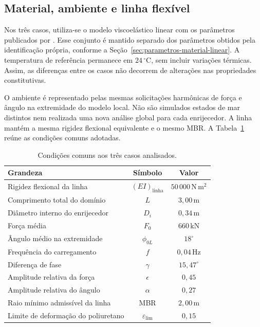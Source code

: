 \documentclass[arial,centeredequations,english,brazilian,oneside,section=TITLE]{ifes8}
\begin{document}
\subsection{Material, ambiente e linha flexível}
\label{sec:material-ambiente-linha-flexivel}

Nos três casos, utiliza-se o modelo viscoelástico linear com os parâmetros
publicados por . Esse conjunto é mantido separado
dos parâmetros obtidos pela identificação própria, conforme a
Seção~\ref{sec:parametros-material-linear}. A temperatura de referência
permanece em $24\,^{\circ}\mathrm{C}$, sem incluir variações térmicas.
Assim, as diferenças entre os casos não decorrem de alterações nas
propriedades constitutivas.

O ambiente é representado pelas mesmas solicitações harmônicas de força e
ângulo na extremidade do modelo local. Não são simulados estados de mar
distintos nem realizada uma nova análise global para cada enrijecedor.
A linha mantém a mesma rigidez flexional equivalente e o mesmo MBR.
A Tabela~\ref{tab:condicoes-comuns-estudo} reúne as condições comuns adotadas.

\begin{table}[!htbp]
  \centering
  \caption{Condições comuns aos três casos analisados.}
  \label{tab:condicoes-comuns-estudo}
  \begin{tabular}{l c c}
    \hline
    Grandeza & Símbolo & Valor\\
    \hline
    Rigidez flexional da linha & $(EI)_{\mathrm{linha}}$ & $50\,000\,\mathrm{N\,m^2}$\\
    Comprimento total do domínio & $L$ & $3{,}00\,\mathrm{m}$\\
    Diâmetro interno do enrijecedor & $D_i$ & $0{,}34\,\mathrm{m}$\\
    Força média & $F_0$ & $660\,\mathrm{kN}$\\
    Ângulo médio na extremidade & $\phi_{0L}$ & $18^\circ$\\
    Frequência do carregamento & $f$ & $0{,}04\,\mathrm{Hz}$\\
    Diferença de fase & $\gamma$ & $15{,}47^\circ$\\
    Amplitude relativa da força & $\epsilon$ & $0{,}45$\\
    Amplitude relativa do ângulo & $\alpha$ & $0{,}27$\\
    Raio mínimo admissível da linha & MBR & $2{,}00\,\mathrm{m}$\\
    Limite de deformação do poliuretano & $\varepsilon_{\mathrm{lim}}$ & $0{,}15$\\
    \hline
  \end{tabular}
\end{table}
\end{document}
